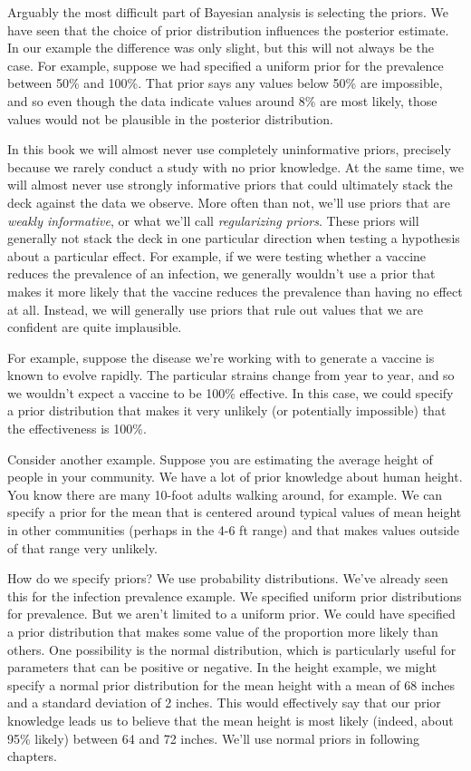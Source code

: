 \documentclass[
]{book}
\begin{document}
Arguably the most difficult part of Bayesian analysis is selecting the
priors. We have seen that the choice of prior distribution influences
the posterior estimate. In our example the difference was only slight,
but this will not always be the case. For example, suppose we had
specified a uniform prior for the prevalence between 50\% and 100\%. That
prior says any values below 50\% are impossible, and so even though the
data indicate values around 8\% are most likely, those values would not
be plausible in the posterior distribution.

In this book we will almost never use completely uninformative priors,
precisely because we rarely conduct a study with no prior knowledge. At
the same time, we will almost never use strongly informative priors that
could ultimately stack the deck against the data we observe. More often
than not, we'll use priors that are \emph{weakly informative}, or what we'll
call \emph{regularizing priors}. These priors will generally not stack the
deck in one particular direction when testing a hypothesis about a
particular effect. For example, if we were testing whether a vaccine
reduces the prevalence of an infection, we generally wouldn't use a
prior that makes it more likely that the vaccine reduces the prevalence
than having no effect at all. Instead, we will generally use priors that
rule out values that we are confident are quite implausible.

For example, suppose the disease we're working with to generate a
vaccine is known to evolve rapidly. The particular strains change from
year to year, and so we wouldn't expect a vaccine to be 100\% effective.
In this case, we could specify a prior distribution that makes it very
unlikely (or potentially impossible) that the effectiveness is 100\%.

Consider another example. Suppose you are estimating the average height
of people in your community. We have a lot of prior knowledge about
human height. You know there are many 10-foot adults walking around, for
example. We can specify a prior for the mean that is centered around
typical values of mean height in other communities (perhaps in the 4-6
ft range) and that makes values outside of that range very unlikely.

How do we specify priors? We use probability distributions. We've
already seen this for the infection prevalence example. We specified
uniform prior distributions for prevalence. But we aren't limited to a
uniform prior. We could have specified a prior distribution that makes
some value of the proportion more likely than others. One possibility is
the normal distribution, which is particularly useful for parameters
that can be positive or negative. In the height example, we might
specify a normal prior distribution for the mean height with a mean of
68 inches and a standard deviation of 2 inches. This would effectively
say that our prior knowledge leads us to believe that the mean height is
most likely (indeed, about 95\% likely) between 64 and 72 inches. We'll
use normal priors in following chapters.
\end{document}
